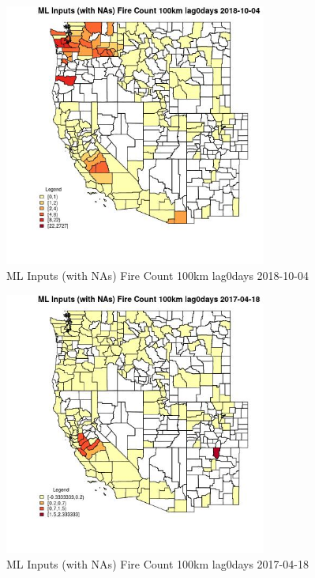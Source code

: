 \begin{figure} 
\centering  
\includegraphics[width=0.77\textwidth]{Code_Outputs/Report_ML_input_PM25_Step4_part_f_de_duplicated_aves_prioritize_24hr_obswNAs_CountyFire_Count_100km_lag0daysMean2018-10-04.jpg} 
\caption{\label{fig:Report_ML_input_PM25_Step4_part_f_de_duplicated_aves_prioritize_24hr_obswNAsCountyFire_Count_100km_lag0daysMean2018-10-04}ML Inputs (with NAs) Fire Count 100km lag0days 2018-10-04} 
\end{figure} 
 

\begin{figure} 
\centering  
\includegraphics[width=0.77\textwidth]{Code_Outputs/Report_ML_input_PM25_Step4_part_f_de_duplicated_aves_prioritize_24hr_obswNAs_CountyFire_Count_100km_lag0daysMean2017-04-18.jpg} 
\caption{\label{fig:Report_ML_input_PM25_Step4_part_f_de_duplicated_aves_prioritize_24hr_obswNAsCountyFire_Count_100km_lag0daysMean2017-04-18}ML Inputs (with NAs) Fire Count 100km lag0days 2017-04-18} 
\end{figure} 
 

